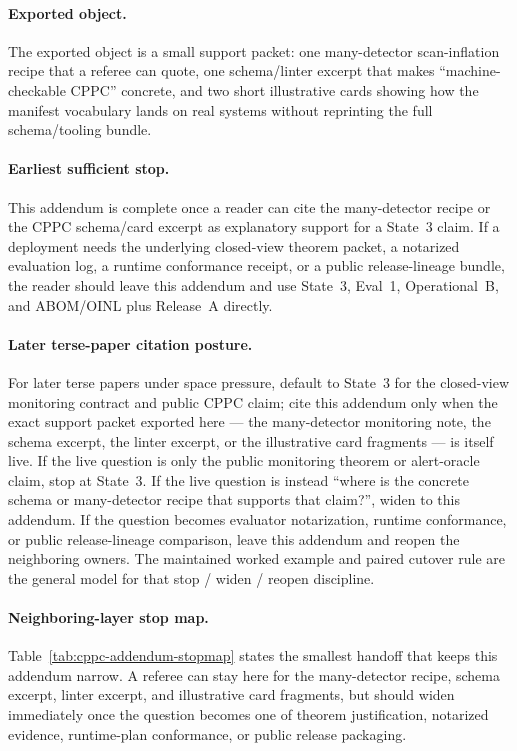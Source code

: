 \documentclass[11pt]{article}
\theoremstyle{definition}
\theoremstyle{remark}
\begin{document}
\paragraph{Exported object.}
The exported object is a small support packet: one many-detector scan-inflation recipe that a referee can quote, one schema/linter excerpt that makes ``machine-checkable CPPC'' concrete, and two short illustrative cards showing how the manifest vocabulary lands on real systems without reprinting the full schema/tooling bundle.

\paragraph{Earliest sufficient stop.}
This addendum is complete once a reader can cite the many-detector recipe or the CPPC schema/card excerpt as explanatory support for a State~3 claim.
If a deployment needs the underlying closed-view theorem packet, a notarized evaluation log, a runtime conformance receipt, or a public release-lineage bundle, the reader should leave this addendum and use State~3, Eval~1, Operational~B, and ABOM/OINL plus Release~A directly.\cite{series:state3,series:evalnotary,series:opB,series:abomoinl,series:releaseproperty}

\paragraph{Later terse-paper citation posture.}
For later terse papers under space pressure, default to State~3 for the closed-view monitoring contract and public CPPC claim; cite this addendum only when the exact support packet exported here --- the many-detector monitoring note, the schema excerpt, the linter excerpt, or the illustrative card fragments --- is itself live.
If the live question is only the public monitoring theorem or alert-oracle claim, stop at State~3.
If the live question is instead ``where is the concrete schema or many-detector recipe that supports that claim?'', widen to this addendum.
If the question becomes evaluator notarization, runtime conformance, or public release-lineage comparison, leave this addendum and reopen the neighboring owners.
The maintained worked example and paired cutover rule are the general model for that stop / widen / reopen discipline.\cite{series:workedexample,series:pairedterminalcutoverrules}

\paragraph{Neighboring-layer stop map.}
Table~\ref{tab:cppc-addendum-stopmap} states the smallest handoff that keeps this addendum narrow.
A referee can stay here for the many-detector recipe, schema excerpt, linter excerpt, and illustrative card fragments, but should widen immediately once the question becomes one of theorem justification, notarized evidence, runtime-plan conformance, or public release packaging.
\end{document}

